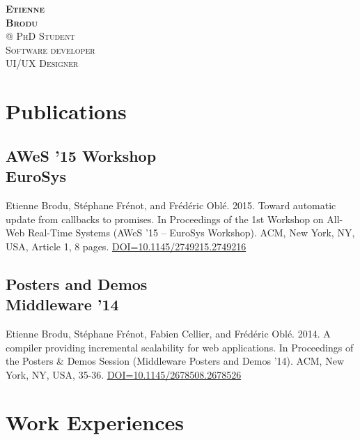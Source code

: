 
\usepackage[english]{babel}


\pagestyle{empty}

	{%
		\textbf{\textsc{Etienne}\\
			      \textsc{Brodu}}\\\vspace{0.2cm}
			      @
	}
	{%
		\textsc{PhD Student}\\
		\textsc{Software developer}\\
		\textsc{UI/UX Designer}
	}
	
\section{Publications}

	\subsection{AWeS '15 Workshop\\EuroSys}{
		Etienne Brodu, Stéphane Frénot, and Frédéric Oblé. 2015.
		Toward automatic update from callbacks to promises.
		In Proceedings of the 1st Workshop on All-Web Real-Time Systems (AWeS '15 – EuroSys Workshop).
		ACM, New York, NY, USA, Article 1, 8 pages.
		\href{http://doi.acm.org/10.1145/2749215.2749216}{DOI=10.1145/2749215.2749216}
	}

	\subsection{Posters and Demos\\Middleware '14}{
		Etienne Brodu, Stéphane Frénot, Fabien Cellier, and Frédéric Oblé.
		2014. A compiler providing incremental scalability for web applications.
		In Proceedings of the Posters \& Demos Session (Middleware Posters and Demos '14).
		ACM, New York, NY, USA, 35-36.
		\href{http://doi.acm.org/10.1145/2678508.2678526}{DOI=10.1145/2678508.2678526}
	}

\section{Work Experiences}

